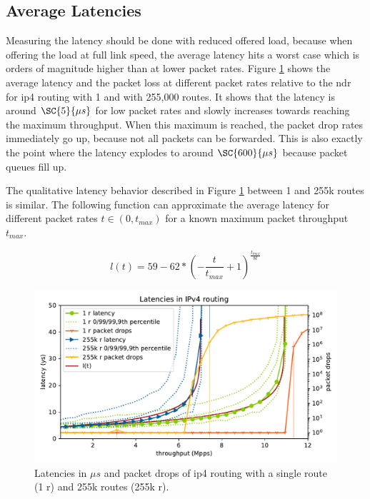 \subsection{Average Latencies}


Measuring the latency should be done with reduced offered load,
because when offering the load at full link speed, the average latency
hits a worst case which is orders of magnitude higher than at lower
packet rates. Figure \ref{graph:latencyoverview} shows the average
latency and the packet loss at different packet rates relative to the
\Ac{ndr} for \Ac{ip4} routing with 1 and with 255,000 routes. It shows
that the latency is around $\SC{5}{\mu s}$ for low packet rates and
slowly increases towards reaching the maximum throughput. When this
maximum is reached, the packet drop rates immediately go up, because
not all packets can be forwarded. This is also exactly the point where
the latency explodes to around $\SC{600}{\mu s}$ because packet queues
fill up.

The qualitative latency behavior described in Figure
\ref{graph:latencyoverview} between 1 and 255k routes is similar. The
following function can approximate the average latency for different
packet rates $t \in (0, t_{max})$ for a known maximum packet
throughput $t_{max}$. 

$$ l(t) = 59 - 62 * (-\frac{t}{t_{max}}+1)^{\frac{t_{max}}{8t}} $$ 



\begin{figure}[!ht]
\noindent\hspace{0.5mm}\includegraphics[width=\linewidth]{pics/latencies_per_throughput_summary_ip4.pdf}
\caption{Latencies in $\mu s$ and packet drops of \Ac{ip4} routing with a single route (1 r) and 255k routes (255k r). }
\label{graph:latencyoverview}
\end{figure}

